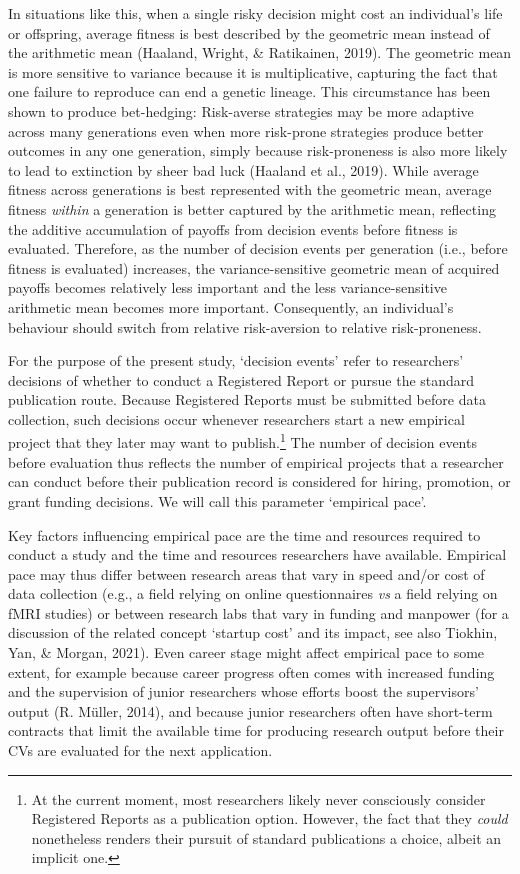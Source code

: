 \documentclass[
  ,man,mask,floatsintext]{apa6}
\begin{document}
In situations like this, when a single risky decision might cost an individual's life or offspring, average fitness is best described by the geometric mean instead of the arithmetic mean (Haaland, Wright, \& Ratikainen, 2019).
The geometric mean is more sensitive to variance because it is multiplicative, capturing the fact that one failure to reproduce can end a genetic lineage.
This circumstance has been shown to produce bet-hedging:
Risk-averse strategies may be more adaptive across many generations even when more risk-prone strategies produce better outcomes in any one generation, simply because risk-proneness is also more likely to lead to extinction by sheer bad luck (Haaland et al., 2019).
While average fitness across generations is best represented with the geometric mean, average fitness \emph{within} a generation is better captured by the arithmetic mean, reflecting the additive accumulation of payoffs from decision events before fitness is evaluated.
Therefore, as the number of decision events per generation (i.e., before fitness is evaluated) increases, the variance-sensitive geometric mean of acquired payoffs becomes relatively less important and the less variance-sensitive arithmetic mean becomes more important.
Consequently, an individual's behaviour should switch from relative risk-aversion to relative risk-proneness.

For the purpose of the present study, `decision events' refer to researchers' decisions of whether to conduct a Registered Report or pursue the standard publication route.
Because Registered Reports must be submitted before data collection, such decisions occur whenever researchers start a new empirical project that they later may want to publish.\footnote{At the current moment, most researchers likely never consciously consider Registered Reports as a publication option. However, the fact that they \emph{could} nonetheless renders their pursuit of standard publications a choice, albeit an implicit one.}
The number of decision events before evaluation thus reflects the number of empirical projects that a researcher can conduct before their publication record is considered for hiring, promotion, or grant funding decisions.
We will call this parameter `empirical pace'.

Key factors influencing empirical pace are the time and resources required to conduct a study and the time and resources researchers have available.
Empirical pace may thus differ between research areas that vary in speed and/or cost of data collection (e.g., a field relying on online questionnaires \emph{vs} a field relying on fMRI studies) or between research labs that vary in funding and manpower (for a discussion of the related concept `startup cost' and its impact, see also Tiokhin, Yan, \& Morgan, 2021).
Even career stage might affect empirical pace to some extent, for example because career progress often comes with increased funding and the supervision of junior researchers whose efforts boost the supervisors' output (R. Müller, 2014), and because junior researchers often have short-term contracts that limit the available time for producing research output before their CVs are evaluated for the next application.
\end{document}
